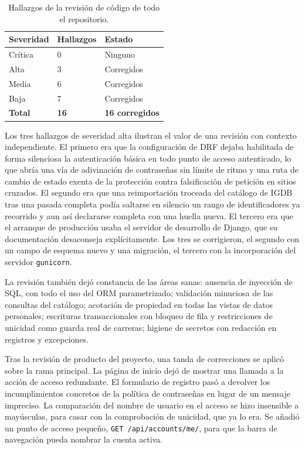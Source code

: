 \begin{table}[htp]
\centering
\begin{tabularx}{\textwidth}{ | L{0.25\textwidth} | C{0.18\textwidth} | Y | }
    \hline
    \textbf{Severidad} & \textbf{Hallazgos} & \textbf{Estado} \\
    \hline
    Crítica & 0 & Ninguno \\
    \hline
    Alta & 3 & Corregidos \\
    \hline
    Media & 6 & Corregidos \\
    \hline
    Baja & 7 & Corregidos \\
    \hline
    \textbf{Total} & \textbf{16} & \textbf{16 corregidos} \\
    \hline
\end{tabularx}
\caption{Hallazgos de la revisión de código de todo el repositorio.}
\label{tab:hallazgos}
\end{table}

Los tres hallazgos de severidad alta ilustran el valor de una revisión con contexto
independiente. El primero era que la configuración de DRF dejaba habilitada de forma
silenciosa la autenticación básica en todo punto de acceso autenticado, lo que abría una vía
de adivinación de contraseñas sin límite de ritmo y una ruta de cambio de estado exenta de la
protección contra falsificación de petición en sitios cruzados. El segundo era que una
reimportación troceada del catálogo de IGDB tras una pasada completa podía saltarse en
silencio un rango de identificadores ya recorrido y aun así declararse completa con una huella
nueva. El tercero era que el arranque de producción usaba el servidor de desarrollo de
Django, que su documentación desaconseja explícitamente. Los tres se corrigieron, el segundo
con un campo de esquema nuevo y una migración, el tercero con la incorporación del servidor
\texttt{gunicorn}.

La revisión también dejó constancia de las áreas sanas: ausencia de inyección de SQL, con
todo el uso del ORM parametrizado; validación minuciosa de las consultas del catálogo;
acotación de propiedad en todas las vistas de datos personales; escrituras transaccionales
con bloqueo de fila y restricciones de unicidad como guarda real de carreras; higiene de
secretos con redacción en registros y excepciones.

Tras la revisión de producto del proyecto, una tanda de correcciones se aplicó sobre la rama
principal. La página de inicio dejó de
mostrar una llamada a la acción de acceso redundante. El formulario de registro pasó a
devolver los incumplimientos concretos de la política de contraseñas en lugar de un mensaje
impreciso. La comparación del nombre de usuario en el acceso se hizo insensible a mayúsculas,
para casar con la comprobación de unicidad, que ya lo era. Se añadió un punto de acceso
pequeño, \texttt{GET /api/accounts/me/}, para que la barra de navegación pueda nombrar la
cuenta activa.

